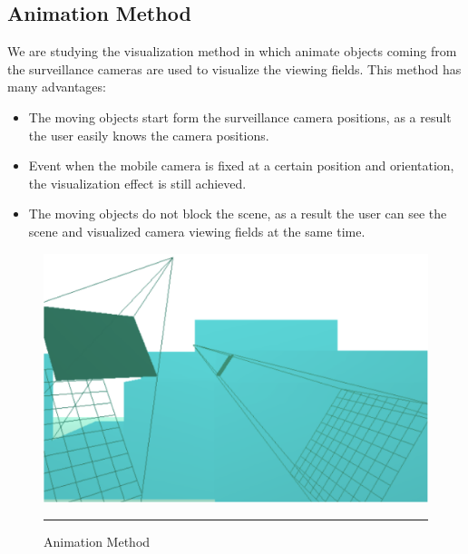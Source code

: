 \subsection{Animation Method}

We are studying the visualization method in which animate objects coming from the surveillance cameras are used to visualize the viewing fields. This method has  many advantages:

\begin{itemize}
	\item The moving objects start form the surveillance camera positions, as a result the user easily knows the camera positions.
	\item Event when the mobile camera is fixed at a certain position and orientation, the visualization effect is still achieved.
	\item The moving objects do not block the scene, as a result the user can see the scene and visualized camera viewing fields at the same time.
\end{itemize}

\begin{figure}[htbp]
	\centering
	\includegraphics{./Primitives/theory_animation.png}
	\rule{35em}{0.5pt}
	\caption[Volume Method]{Animation Method}
	\label{fig:AnimationMethod}
\end{figure}
